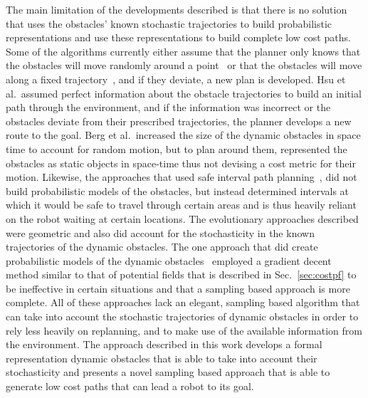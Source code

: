 The main limitation of the developments described is that there is no solution
that uses the obstacles' known stochastic trajectories to build probabilistic
representations and use these representations to build complete low cost paths.
Some of the algorithms currently either assume that the planner only knows that
the obstacles will move randomly around a point~\cite{rodriguez2007framework}
or that the obstacles will move along a fixed
trajectory~\cite{hsu2002randomized}, and if they deviate, a new plan is
developed. Hsu et al.\ assumed perfect information about the obstacle
trajectories to build an initial path through the environment, and if the
information was incorrect or the obstacles deviate from their prescribed
trajectories, the planner develops a new route to the goal. Berg et al.\
increased the size of the dynamic obstacles in space time to account for random
motion, but to plan around them, represented the obstacles as static objects in
space-time thus not devising a cost metric for their motion. Likewise, the
approaches that used safe interval path planning~\cite{asipp, sipp}, did not
build probabilistic models of the obstacles, but instead determined intervals
at which it would be safe to travel through certain areas and is thus heavily
reliant on the robot waiting at certain locations. The evolutionary approaches
described were geometric and also did account for the stochasticity in the
known trajectories of the dynamic obstacles. The one approach that did create
probabilistic models of the dynamic obstacles~\cite{jensen2003motion} employed
a gradient decent method similar to that of potential fields that is described
in Sec.~\ref{sec:costpf} to be ineffective in certain situations and that a
sampling based approach is more complete. All of these approaches lack an
elegant, sampling based algorithm that can take into account the stochastic
trajectories of dynamic obstacles in order to rely less heavily on replanning,
and to make use of the available information from the environment. The approach
described in this work develops a formal representation dynamic obstacles that
is able to take into account their stochasticity and presents a novel sampling
based approach that is able to generate low cost paths that can lead a robot to
its goal.



